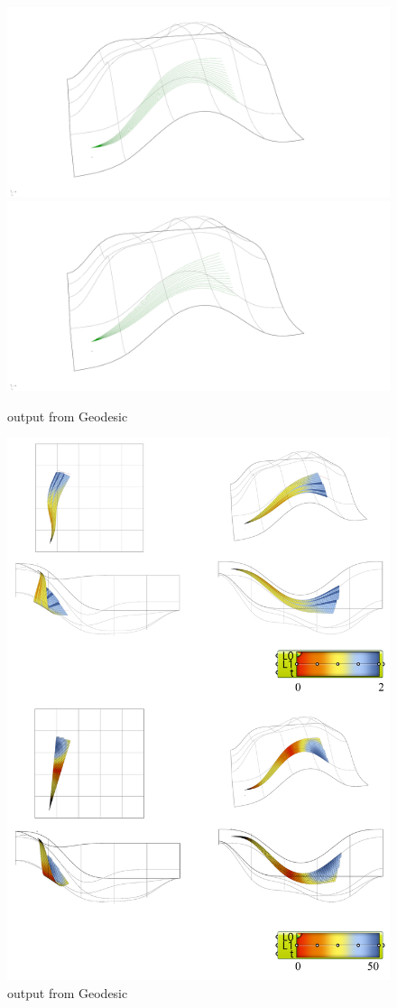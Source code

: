 \begin{figure}[H]
\centering
\includegraphics[width=0.45\linewidth ]{figure/Results/curves.jpg}
\includegraphics[width=0.45\linewidth ]{figure/Results/geo.jpg}
\caption{output from Geodesic}
\end{figure}



\begin{figure}[H]
\centering
\includegraphics[width=1.0\linewidth ]{figure/Results/mathDiff.jpg}
\caption{output from Geodesic}
\end{figure}

